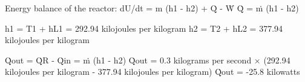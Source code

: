 Energy balance of the reactor:  
dU/dt = m (h1 - h2) + Q̇ - Ẇ  
Q̇ = ṁ (h1 - h2)  

h1 = T1 + hL1 = 292.94 kilojoules per kilogram  
h2 = T2 + hL2 = 377.94 kilojoules per kilogram  

Q̇out = Q̇R - Q̇in = ṁ (h1 - h2)  
Q̇out = 0.3 kilograms per second × (292.94 kilojoules per kilogram - 377.94 kilojoules per kilogram)  
Q̇out = -25.8 kilowatts